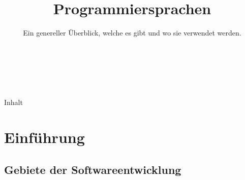 

\title{Programmiersprachen}
\subtitle{Ein genereller Überblick, welche es gibt und wo sie verwendet werden.}




\backgroundTitle
\begin{frame}
    \thispagestyle{empty}
    \begin{columns}
        \column{0.6\paperwidth}
        \color{hhuBlau}
        \LARGE \inserttitle\\[\baselineskip]
        \large \insertauthor
    \end{columns}
\end{frame}
\backgroundNormal

\begin{frame}{Inhalt}
    \thispagestyle{empty}
    \tableofcontents
\end{frame}


\section{Einführung}

%

\subsection{Gebiete der Softwareentwicklung}

